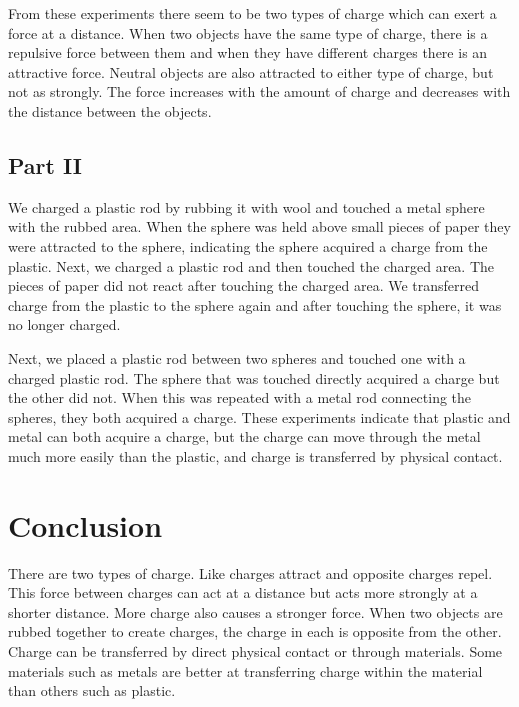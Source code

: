\documentclass[12pt]{article}
\begin{document}
        From these experiments there seem to be two types of charge which can exert a force at a distance. When two objects have the same type of charge, there is a repulsive force between them and when they have different charges there is an attractive force. Neutral objects are also attracted to either type of charge, but not as strongly. The force increases with the amount of charge and decreases with the distance between the objects.

        \subsection{Part II}
        We charged a plastic rod by rubbing it with wool and touched a metal sphere with the rubbed area. When the sphere was held above small pieces of paper they were attracted to the sphere, indicating the sphere acquired a charge from the plastic. Next, we charged a plastic rod and then touched the charged area. The pieces of paper did not react after touching the charged area. We transferred charge from the plastic to the sphere again and after touching the sphere, it was no longer charged.

        Next, we placed a plastic rod between two spheres and touched one with a charged plastic rod. The sphere that was touched directly acquired a charge but the other did not. When this was repeated with a metal rod connecting the spheres, they both acquired a charge. These experiments indicate that plastic and metal can both acquire a charge, but the charge can move through the metal much more easily than the plastic, and charge is transferred by physical contact.
    \section{Conclusion}
        There are two types of charge. Like charges attract and opposite charges repel. This force between charges can act at a distance but acts more strongly at a shorter distance. More charge also causes a stronger force. When two objects are rubbed together to create charges, the charge in each is opposite from the other. Charge can be transferred by direct physical contact or through materials. Some materials such as metals are better at transferring charge within the material than others such as plastic.
\end{document}
